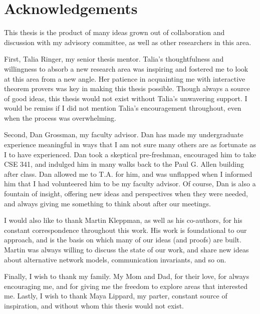 \chapter{Acknowledgements}

This thesis is the product of many ideas grown out of collaboration and
discussion with my advisory committee, as well as other researchers in this
area.

First, Talia Ringer, my senior thesis mentor. Talia's thoughtfulness and
willingness to absorb a new research area was inspiring and fostered me to
look at this area from a new angle. Her patience in acquainting me with
interactive theorem provers was key in making this thesis possible. Though
always a source of good ideas, this thesis would not exist without Talia's
unwavering support. I would be remiss if I did not mention Talia's encouragement
throughout, even when the process was overwhelming.

Second, Dan Grossman, my faculty advisor. Dan has made my undergraduate
experience meaningful in ways that I am not sure many others are as fortunate as
I to have experienced. Dan took a skeptical pre-freshman, encouraged him to take
CSE 341, and indulged him in many walks back to the Paul G. Allen building after
class. Dan allowed me to T.A. for him, and was unflapped when I informed him
that I had volunteered him to be my faculty advisor. Of course, Dan is also a
fountain of insight, offering new ideas and perspectives when they were needed,
and always giving me something to think about after our meetings.

I would also like to thank Martin Kleppman, as well as his co-authors, for his
constant correspondence throughout this work. His work is foundational to our
approach, and is the basis on which many of our ideas (and proofs) are built.
Martin was always willing to discuss the state of our work, and share new ideas
about alternative network models, communication invariants, and so on.

Finally, I wish to thank my family. My Mom and Dad, for their love, for always
encouraging me, and for giving me the freedom to explore areas that interested
me. Lastly, I wish to thank Maya Lippard, my parter, constant source of
inspiration, and without whom this thesis would not exist.
